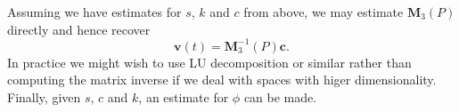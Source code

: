 Assuming we have estimates for $s$, $k$ and $c$ from above, we may
estimate $\mathbf{M}_3(P)$ directly and hence recover
\[
\mathbf{v}(t) = \mathbf{M}^{-1}_3(P) \mathbf{c}.
\]
In practice we might wish to use LU decomposition or similar rather
than computing the matrix inverse if we deal with spaces with higer
dimensionality. Finally, given $s$, $c$ and $k$, an estimate for 
$\phi$ can be made. 
